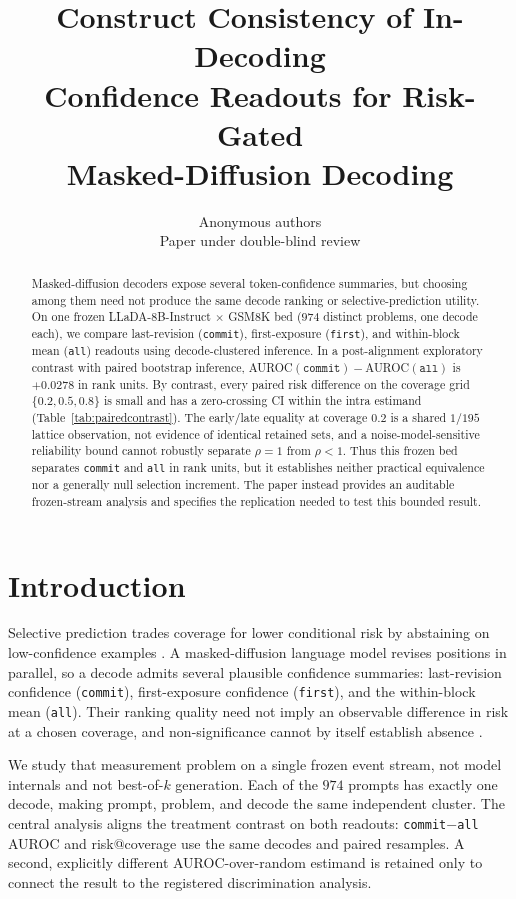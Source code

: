 \documentclass{article}
\title{Construct Consistency of In-Decoding\\
Confidence Readouts for Risk-Gated\\
Masked-Diffusion Decoding}
\author{Anonymous authors\\
Paper under double-blind review}
\begin{document}
\maketitle

\begin{abstract}
Masked-diffusion decoders expose several token-confidence summaries, but choosing
among them need not produce the same decode ranking or selective-prediction
utility.  On one frozen LLaDA-8B-Instruct $\times$ GSM8K bed ($974$ distinct
problems, one decode each), we compare last-revision (\texttt{commit}),
first-exposure (\texttt{first}), and within-block mean (\texttt{all}) readouts
using decode-clustered inference.  In a post-alignment exploratory contrast with
paired bootstrap inference, AUROC$(\texttt{commit})-$AUROC$(\texttt{all})$ is
$+0.0278$ in rank units.  By contrast, every paired risk difference on the
coverage grid $\{0.2,0.5,0.8\}$ is small and has a zero-crossing CI within the
intra estimand (Table~\ref{tab:pairedcontrast}).  The early/late equality at
coverage $0.2$ is a shared $1/195$ lattice observation, not evidence of
identical retained sets, and a noise-model-sensitive reliability bound cannot
robustly separate $\rho=1$ from $\rho<1$.  Thus this frozen bed separates
\texttt{commit} and \texttt{all} in rank units, but it establishes neither
practical equivalence nor a generally null selection increment.  The paper
instead provides an auditable frozen-stream analysis and specifies the
replication needed to test this bounded result.
\end{abstract}

\section{Introduction}
\label{sec:intro}

Selective prediction trades coverage for lower conditional risk by abstaining on low-confidence
examples \citep{chow1970character,elyaniv2010foundations,bartlett2008classification,
geifman2017selective}.  A masked-diffusion language model revises positions in parallel, so a
decode admits several plausible confidence summaries: last-revision confidence
(\texttt{commit}), first-exposure confidence (\texttt{first}), and the within-block mean
(\texttt{all}).  Their ranking quality need not imply an observable difference in risk at a
chosen coverage, and non-significance cannot by itself establish absence
\citep{altman1995absence}.

We study that measurement problem on a single frozen event stream, not model internals and not
best-of-$k$ generation.  Each of the $974$ prompts has exactly one decode, making prompt,
problem, and decode the same independent cluster.  The central analysis aligns the treatment
contrast on both readouts: \texttt{commit}$-$\texttt{all} AUROC and risk@coverage use the same
decodes and paired resamples.  A second, explicitly different AUROC-over-random estimand is
retained only to connect the result to the registered discrimination analysis.
\end{document}
